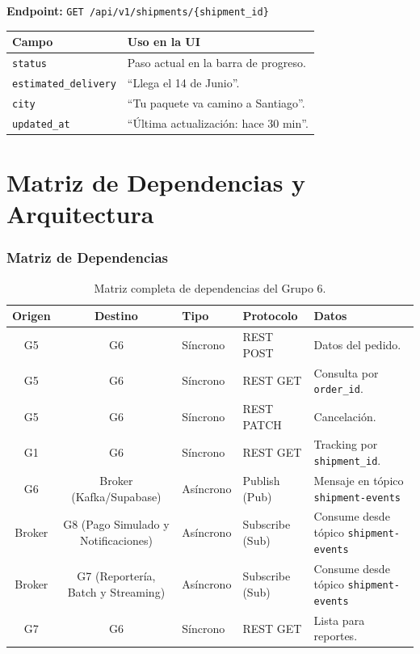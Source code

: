 \documentclass[11pt, a4paper]{article}
\begin{document}
\textbf{Endpoint:} \texttt{GET /api/v1/shipments/\{shipment\_id\}}

\begin{table}[h!]
\centering
\renewcommand{\arraystretch}{1.3}
\begin{tabularx}{\textwidth}{l X}
  \toprule
  \textbf{Campo} & \textbf{Uso en la UI} \\
  \midrule
  \texttt{status}              & Paso actual en la barra de progreso. \\
  \texttt{estimated\_delivery} & ``Llega el 14 de Junio''. \\
  \texttt{city}                & ``Tu paquete va camino a Santiago''. \\
  \texttt{updated\_at}         & ``Última actualización: hace 30 min''. \\
  \bottomrule
\end{tabularx}
\end{table}


\newpage
\part{Matriz de Dependencias y Arquitectura}

\section{Matriz de Dependencias}

\begin{table}[h!]
\centering
\renewcommand{\arraystretch}{1.5}
\begin{tabularx}{\textwidth}{c c l l X}
  \toprule
  \textbf{Origen} & \textbf{Destino} & \textbf{Tipo} & \textbf{Protocolo} & \textbf{Datos} \\
  \midrule
  G5  & G6  & Síncrono  & REST POST    & Datos del pedido. \\
  G5  & G6  & Síncrono  & REST GET     & Consulta por \texttt{order\_id}. \\
  G5  & G6  & Síncrono  & REST PATCH   & Cancelación. \\
  G1  & G6  & Síncrono  & REST GET     & Tracking por \texttt{shipment\_id}. \\
  G6     & Broker (Kafka/Supabase) & Asíncrono & Publish (Pub)   & Mensaje en tópico \texttt{shipment-events} \\
  Broker & G8 (Pago Simulado y Notificaciones)     & Asíncrono & Subscribe (Sub) & Consume desde tópico \texttt{shipment-events} \\
  Broker & G7 (Reportería, Batch y Streaming)        & Asíncrono & Subscribe (Sub) & Consume desde tópico \texttt{shipment-events} \\
  G7 & G6  & Síncrono  & REST GET     & Lista para reportes. \\
  \bottomrule
\end{tabularx}
\caption{Matriz completa de dependencias del Grupo 6.}
\end{table}
\end{document}
